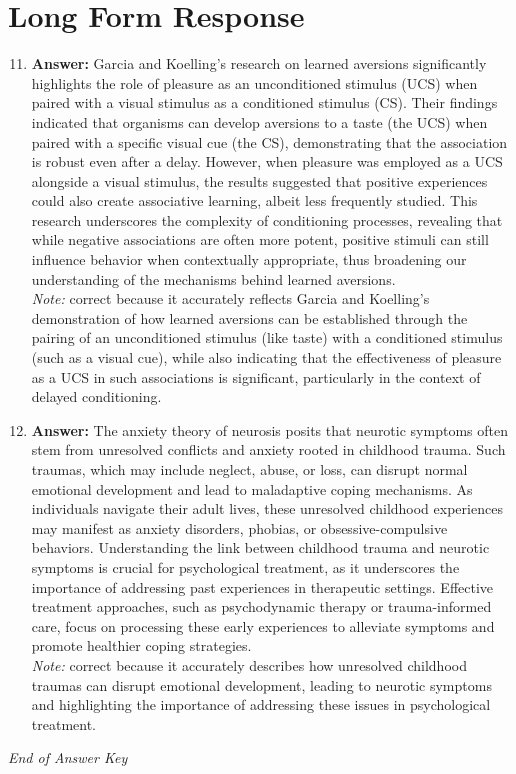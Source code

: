 \documentclass[12pt]{article}
\begin{document}
\section*{Long Form Response}
\begin{enumerate}[label=\arabic*.]
\setcounter{enumi}{10}
\item \textbf{Answer:} Garcia and Koelling's research on learned aversions significantly highlights the role of pleasure as an unconditioned stimulus (UCS) when paired with a visual stimulus as a conditioned stimulus (CS). Their findings indicated that organisms can develop aversions to a taste (the UCS) when paired with a specific visual cue (the CS), demonstrating that the association is robust even after a delay. However, when pleasure was employed as a UCS alongside a visual stimulus, the results suggested that positive experiences could also create associative learning, albeit less frequently studied. This research underscores the complexity of conditioning processes, revealing that while negative associations are often more potent, positive stimuli can still influence behavior when contextually appropriate, thus broadening our understanding of the mechanisms behind learned aversions.
\\ \textit{Note:} correct because it accurately reflects Garcia and Koelling's demonstration of how learned aversions can be established through the pairing of an unconditioned stimulus (like taste) with a conditioned stimulus (such as a visual cue), while also indicating that the effectiveness of pleasure as a UCS in such associations is significant, particularly in the context of delayed conditioning.
\item \textbf{Answer:} The anxiety theory of neurosis posits that neurotic symptoms often stem from unresolved conflicts and anxiety rooted in childhood trauma. Such traumas, which may include neglect, abuse, or loss, can disrupt normal emotional development and lead to maladaptive coping mechanisms. As individuals navigate their adult lives, these unresolved childhood experiences may manifest as anxiety disorders, phobias, or obsessive-compulsive behaviors. Understanding the link between childhood trauma and neurotic symptoms is crucial for psychological treatment, as it underscores the importance of addressing past experiences in therapeutic settings. Effective treatment approaches, such as psychodynamic therapy or trauma-informed care, focus on processing these early experiences to alleviate symptoms and promote healthier coping strategies.
\\ \textit{Note:} correct because it accurately describes how unresolved childhood traumas can disrupt emotional development, leading to neurotic symptoms and highlighting the importance of addressing these issues in psychological treatment.
\end{enumerate}

\vfill
\noindent\textit{End of Answer Key}
\end{document}
